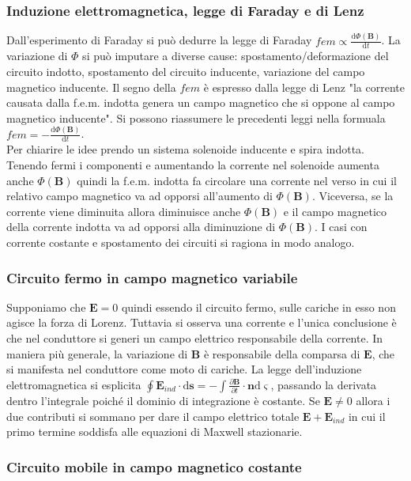 \documentclass[11pt,a4paper]{article}
\newcommand{\de}{\mathrm d}
\newcommand{\fracd}[2]{\frac{\de #1}{\de #2}}
\newcommand{\fracp}[2]{\frac{\partial #1}{\partial #2}}
\begin{document}
\subsubsection{Induzione elettromagnetica, legge di Faraday e di Lenz}
Dall'esperimento di Faraday si può dedurre la legge di Faraday $fem \propto \fracd{\Phi(\mathbf B)}{t}$. La variazione di $\Phi$ si può imputare a diverse cause: spostamento/deformazione del circuito indotto, spostamento del circuito inducente, variazione del campo magnetico inducente. Il segno della $fem$ è espresso dalla legge di Lenz "la corrente causata dalla f.e.m. indotta genera un campo magnetico che si oppone al campo magnetico inducente". Si possono riassumere le precedenti leggi nella formuala $fem = -\fracd{\Phi(\mathbf B)}{t}$.\\
Per chiarire le idee prendo un sistema solenoide inducente e spira indotta. Tenendo fermi i componenti e aumentando la corrente nel solenoide aumenta anche $\Phi(\mathbf B)$ quindi la f.e.m. indotta fa circolare una corrente nel verso in cui il relativo campo magnetico va ad opporsi all'aumento di $\Phi(\mathbf B)$. Viceversa, se la corrente viene diminuita allora diminuisce anche $\Phi(\mathbf B)$ e il campo magnetico della corrente indotta va ad opporsi alla diminuzione di $\Phi(\mathbf B)$. I casi con corrente costante e spostamento dei circuiti si ragiona in modo analogo.

\subsubsection{Circuito fermo in campo magnetico variabile}
Supponiamo che $\mathbf E = 0$ quindi essendo il circuito fermo, sulle cariche in esso non agisce la forza di Lorenz. Tuttavia si osserva una corrente e l'unica conclusione è che nel conduttore si generi un campo elettrico responsabile della corrente. In maniera più generale, la variazione di $\mathbf B$ è responsabile della comparsa di $\mathbf E$, che si manifesta nel conduttore come moto di cariche. La legge dell'induzione elettromagnetica si esplicita $\oint \mathbf E_{ind} \cdot \de\mathbf s = -\int \fracp{\mathbf B}t \cdot \mathbf n \de\varsigma$, passando la derivata dentro l'integrale poiché il dominio di integrazione è costante. Se $\mathbf E \neq 0$ allora i due contributi si sommano per dare il campo elettrico totale $\mathbf E + \mathbf E_{ind}$  in cui il primo termine soddisfa alle equazioni di Maxwell stazionarie.

\subsubsection{Circuito mobile in campo magnetico costante}
\end{document}
